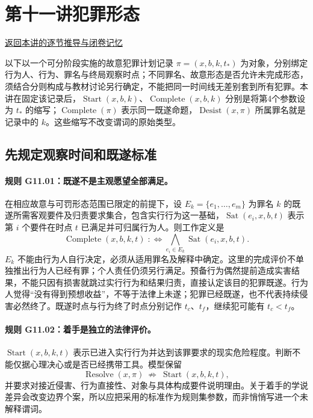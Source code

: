 \section{第十一讲\quad 犯罪形态}

\label{ref:lecture:11}

\noindent\hyperref[lecture:11]{返回本讲的逐节推导与闭卷记忆}

以下以一个可分阶段实施的故意犯罪计划记录 $\pi=(x,b,k,t_*)$ 为对象，分别绑定行为人、行为、罪名与终局观察时点；不同罪名、故意形态是否允许未完成形态，须结合分则构成与教材讨论另行确定，不能把同一时间线无差别套到所有犯罪。本讲在固定该记录后，$\operatorname{Start}(x,b,k)$、$\operatorname{Complete}(x,b,k)$ 分别是将第4个参数设为 $t_*$ 的缩写；$\operatorname{Complete}(\pi)$ 表示同一既遂命题，$\operatorname{Desist}(x,\pi)$ 所属罪名就是记录中的 $k$。这些缩写不改变谓词的原始类型。

\subsection{先规定观察时间和既遂标准}
\paragraph{规则 G11.01：既遂不是主观愿望全部满足。}
在相应故意与可罚形态范围已限定的前提下，设 $E_k=\{e_1,\ldots,e_m\}$ 为罪名 $k$ 的既遂所需客观要件及归责要求集合，包含实行行为这一基础，$\operatorname{Sat}(e_i,x,b,t)$ 表示第 $i$ 个要件在时点 $t$ 已满足并可归属行为人。则工作定义是
\[
\operatorname{Complete}(x,b,k,t)\;:\!\!\iff
\bigwedge_{e_i\in E_k}\operatorname{Sat}(e_i,x,b,t).
\]
$E_k$ 不能由行为人自行决定，必须从适用罪名及解释中确定。这里的完成评价不单独推出行为人已经有罪；个人责任仍须另行满足。预备行为偶然提前造成实害结果，不能只因有损害就跳过实行行为和结果归责，直接认定该目的犯罪既遂。行为人觉得“没有得到预想收益”，不等于法律上未遂；犯罪已经既遂，也不代表持续侵害必然终了。既遂时点与行为终了时点分别记作 $t_c$、$t_f$，继续犯可能有 $t_c<t_f$。

\paragraph{规则 G11.02：着手是独立的法律评价。}
$\operatorname{Start}(x,b,k,t)$ 表示已进入实行行为并达到该罪要求的现实危险程度。判断不能仅据心理决心或是否已经携带工具。模型保留
\[
\operatorname{Resolve}(x,\pi)\ \not\Longrightarrow\ \operatorname{Start}(x,b,k,t),
\]
并要求对接近侵害、行为直接性、对象与具体构成要件说明理由。关于着手的学说差异会改变边界个案，所以应把采用的标准作为规则集参数，而非悄悄写进一个未解释谓词。


